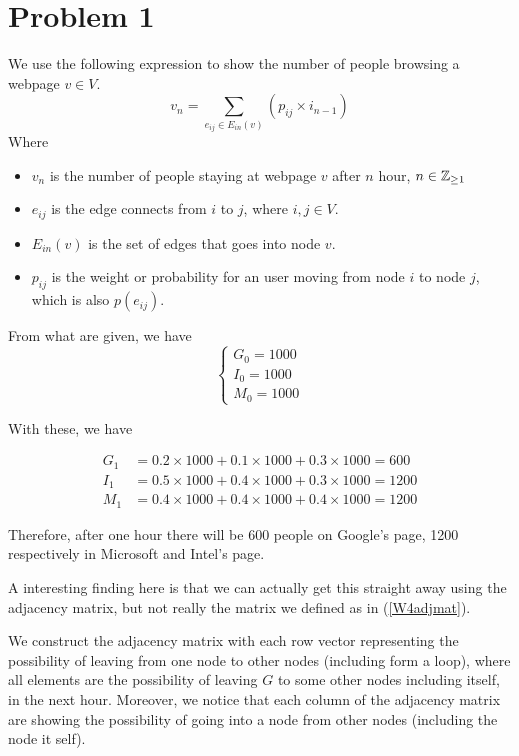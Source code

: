 \documentclass[12pt,a4paper]{article}
\begin{document}
\section*{Problem 1}
\begin{solution}
We use the following expression to show the number of people browsing a webpage $v \in V$.
\[
v_{n} = \sum_{e_{ij}\in E_{in}(v)}( p_{ij}\times i_{n-1})
\]
Where
\begin{itemize}
    \item $v_n$ is the number of people staying at webpage $v$ after $n$ hour, $n\in \mathbb{Z}_{\geq 1}$
    \item $e_{ij}$ is the edge connects from $i$ to $j$, where $i,j\in V$.
    \item $E_{in}(v)$ is the set of edges that goes into node $v$.
    \item $p_{ij}$ is the weight or probability for an user moving from node $i$ to node $j$, which is also $p(e_{ij})$.
\end{itemize}
From what are given, we have
\[
\begin{cases}
    G_0 = 1000\\
    I_0 = 1000\\
    M_0 = 1000
\end{cases}
\]

With these, we have

\begin{align*}
G_1 & =0.2\times 1000+0.1\times 1000+0.3\times 1000 = 600\\
I_1 & =0.5\times 1000+0.4\times 1000+0.3\times 1000 = 1200\\
M_1 & =0.4\times 1000+0.4\times 1000+0.4\times 1000 = 1200
\end{align*}

Therefore, after one hour there will be 600 people on Google's page, 1200 respectively in Microsoft and Intel's page.

\begin{remark}
A interesting finding here is that we can actually get this straight away using the adjacency matrix, but not really the matrix we defined as in (\ref{W4adjmat}).

We construct the adjacency matrix with each row vector representing the possibility of leaving from one node to other nodes (including form a loop), where all elements are the possibility of leaving $G$ to some other nodes including itself, in the next hour. Moreover, we notice that each column of the adjacency matrix are showing the possibility of going into a node from other nodes (including the node it self).


\end{remark}
\end{solution}
\end{document}
